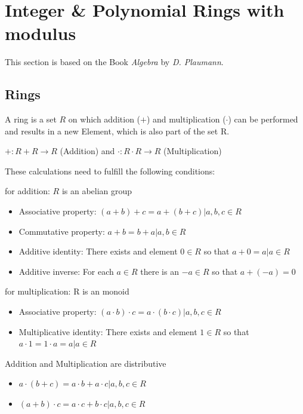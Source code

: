 

\section{Integer \& Polynomial Rings with modulus}
This section is based on the Book \textit{Algebra} by \textit{D. Plaumann}\cite{Algebra}.

\subsection*{Rings}
A ring is a set $R$ on which addition ($+$) and multiplication ($\cdot$) can be performed and results in a new Element, which is also part of the set R.
\begin{center}
  $ +: R+R\rightarrow R$ (Addition) and $\cdot: R \cdot R \rightarrow R$ (Multiplication)
\end{center}

These calculations need to fulfill the following conditions:
\begin{description}
  \item for addition: $R$ is an abelian group
        \begin{itemize}
          \item Associative property: $(a+b)+c = a+(b+c) | a,b,c \in R$
          \item Commutative property: $a+b = b+a | a,b \in R$
          \item Additive identity: There exists and element $0 \in R$ so that $a+0 = a | a \in R$
          \item Additive inverse: For each $a \in R$ there is an $-a \in R$ so that $a+(-a)=0$
        \end{itemize}
  \item for multiplication: R is an monoid
        \begin{itemize}
          \item Associative property: $(a\cdot b) \cdot c = a \cdot(b\cdot c) | a,b,c \in R$
          \item Multiplicative identity: There exists and element $1 \in R$ so that $a \cdot 1 = 1 \cdot a = a | a \in R$
        \end{itemize}
  \item Addition and Multiplication are distributive
        \begin{itemize}
          \item  $a\cdot (b + c) = a\cdot b + a\cdot c | a,b,c \in R$
          \item  $(a + b) \cdot c= a\cdot c + b\cdot c | a,b,c \in R$
        \end{itemize}
\end{description}

